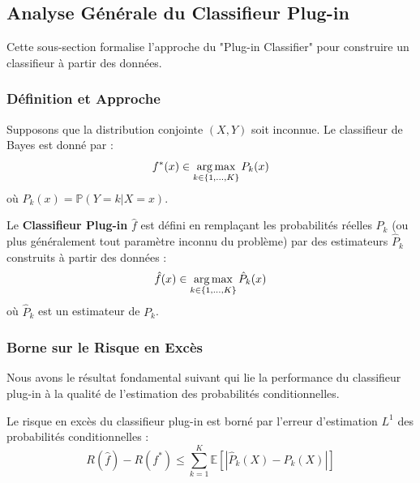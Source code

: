\subsection{Analyse Générale du Classifieur Plug-in}\label{sec:plugin_analysis}

Cette sous-section formalise l'approche du "Plug-in Classifier" pour construire un classifieur à partir des données.

\subsubsection{Définition et Approche}

Supposons que la distribution conjointe $(X, Y)$ soit inconnue.
Le classifieur de Bayes est donné par :
\[
f^*(x) \in \operatorname*{arg\,max}_{k \in \{1, \dots, K\}} P_k(x)
\]
où $P_k(x) = \mathbb{P}(Y=k | X=x)$.

\begin{definition}
Le \textbf{Classifieur Plug-in} $\hat{f}$ est défini en remplaçant les probabilités réelles $P_k$ (ou plus généralement tout paramètre inconnu du problème) par des estimateurs $\hat{P}_k$ construits à partir des données :
\[
\hat{f}(x) \in \operatorname*{arg\,max}_{k \in \{1, \dots, K\}} \hat{P}_k(x)
\]
où $\hat{P}_k$ est un estimateur de $P_k$.
\end{definition}

\subsubsection{Borne sur le Risque en Excès}

Nous avons le résultat fondamental suivant qui lie la performance du classifieur plug-in à la qualité de l'estimation des probabilités conditionnelles.

\begin{theoreme}
Le risque en excès du classifieur plug-in est borné par l'erreur d'estimation $L^1$ des probabilités conditionnelles :
\[
R(\hat{f}) - R(f^*) \le \sum_{k=1}^K \mathbb{E}\left[ |\hat{P}_k(X) - P_k(X)| \right]
\]
\end{theoreme}

